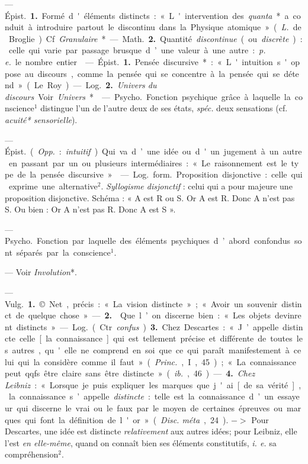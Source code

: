 \begin{itemize}[leftmargin=1cm, label=, itemsep=1pt]
 — \si{Épist.} {\bf 1.} Formé d'éléments distincts : « L'intervention
des {\it quanta}* a conduit à introduire
partout le discontinu dans la Physique atomique » ({\it L.} de Broglie).
Cf. {\it Granulaire}*.

— \si{Math.} {\bf 2.} Quantité {\it discontinue}
(ou {\it discrète}) : celle qui varie par passage brusque d’une valeur à une
autre : {\it p. e.} le nombre entier.

 — \si{Épist.} {\bf 1.} Pensée discursive* : « L'intuition s'oppose au discours, comme la pensée qui se concentre à la pensée qui se détend »
(Le Roy).

— \si{Log.} {\bf 2.} {\it Univers du discours}. Voir {\it Univers}*.

 — \si{Psycho.} Fonction
psychique grâce à laquelle la conscience$^1$ distingue l’un de l'autre
deux de ses états, {\it spéc.} deux sensations
(cf. {\it acuité* sensorielle}).

 — \si{Épist.} ({\it Opp.} : {\it intuitif}).
Qui va d’une idée ou d'un jugement
à un autre en passant par un ou plusieurs intermédiaires :
« Le raisonnement est le type de la pensée discursive. »

 — \si{Log.} \si{form.} Proposition
disjonctive : celle qui exprime une
alternative$^2$. {\it Syllogisme disjonctif} :
celui qui a pour majeure une proposition disjonctive. Schéma : « A
est R ou S. Or A est R. Donc A n'est
pas S. Ou bien : Or A n’est pas R.
Donc A est S ».

 — \si{Psycho.} Fonction par
laquelle des éléments psychiques
d’abord confondus sont séparés par
la conscience$^1$.

 — Voir {\it Involution}*.

 — \si{Vulg.} {\bf 1.} © Net, précis :
« La vision distincte » ; « Avoir un
souvenir distinct de quelque chose ».
— {\bf 2.}  Que l’on discerne bien :
« Les objets devinrent distincts ».

— \si{Log.} (Ctr. {\it confus}) {\bf 3.} Chez
Descartes : « J’appelle distincte celle
[la connaissance] qui est tellement
précise et différente de toutes les
autres, qu'elle ne comprend en soi
que ce qui paraît manifestement à
celui qui la considère comme il faut »
({\it Princ.}, I, 45); « La connaissance
peut qqfs. être claire sans être distincte » ({\it ib.}, 46). — {\bf 4.} {\it Chez Leibniz} :
« Lorsque je puis expliquer les marques que j'ai [de sa vérité], la connaissance s’appelle {\it distincte} : telle
est la connaissance d’un essayeur
qui discerne le vrai ou le faux par
le moyen de certaines épreuves ou
marques qui font la définition de
l'or » ({\it Disc. méta}, 24). $->$ Pour
Descartes, une idée est distincte
{\it relativement} aux autres idées; pour
Leibniz, elle l’est {\it en elle-même},
quand on connaît bien ses éléments
constitutifs, {\it i. e.} sa compréhension$^2$.


\end{itemize}
